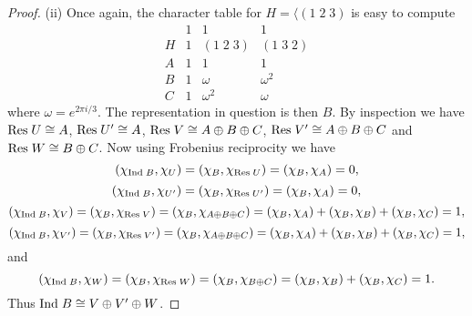 \documentclass{article}
\newcommand{\res}{\textup{Res}\;}
\newcommand{\ind}{\textup{Ind}\;}
\begin{document}
\begin{proof}
(ii) Once again, the character table for $H = \langle (1 \; 2 \; 3)$ is easy to compute
\[
\begin{array}{r|rrr}
& 1 & 1 & 1\\
H & 1 & (1 \; 2 \; 3) & (1 \; 3 \; 2)\\\hline
A & 1 & 1 & 1\\
B & 1 & \omega & \omega^2\\
C & 1 & \omega^2 & \omega
\end{array}
\]
where $\omega = e^{2 \pi i/3}$. The representation in question is then $B$. By inspection we have $\res U \cong A$, $\res U' \cong A$, $\res V \cong A \oplus B \oplus C$, $\res V' \cong A \oplus B \oplus C$ and $\res W \cong B \oplus C$. Now using Frobenius reciprocity we have
\[
(\chi_{\ind B}, \chi_U) = (\chi_B, \chi_{\res U}) = (\chi_B, \chi_A) = 0,
\]
\[
(\chi_{\ind B}, \chi_{U'}) = (\chi_B, \chi_{\res U'}) = (\chi_B, \chi_A) = 0,
\]
\[
(\chi_{\ind B}, \chi_V) = (\chi_B, \chi_{\res V}) = (\chi_B, \chi_{A \oplus B \oplus C}) = (\chi_B, \chi_A) + (\chi_B, \chi_B) + (\chi_B, \chi_C) = 1,
\]
\[
(\chi_{\ind B}, \chi_{V'}) = (\chi_B, \chi_{\res V'}) = (\chi_B, \chi_{A \oplus B \oplus C}) = (\chi_B, \chi_A) + (\chi_B, \chi_B) + (\chi_B, \chi_C) = 1,
\]
and
\[
(\chi_{\ind B}, \chi_W) = (\chi_B, \chi_{\res W}) = (\chi_B, \chi_{B \oplus C}) = (\chi_B, \chi_B) + (\chi_B, \chi_C) = 1.
\]
Thus $\ind B \cong V \oplus V' \oplus W$.
\end{proof}
\end{document}
